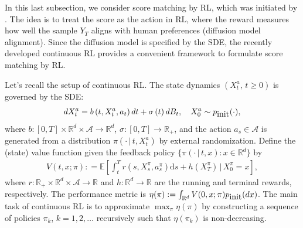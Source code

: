 \documentclass[letterpaper,11pt,reqno]{amsart}
\numberwithin{equation}{section}
\begin{document}
In this last subsection, 
we consider score matching by RL,
which was initiated by \cite{Black23, fan2023optimizing, Lee23}.
The idea is to treat the score as the action in RL,
where the reward measures how well the sample $Y_T$ 
aligns with human preferences (diffusion model alignment).
Since the diffusion model is specified by the SDE,
the recently developed continuous RL \cite{Jia22, Jia222, WZZ20, ZTY23} provides 
a convenient framework to formulate score matching by RL.

\quad Let's recall the setup of continuous RL.
The state dynamics $(X^a_t, \, t \ge 0)$ is governed by the SDE:
\begin{equation}
\label{SDE_dynamic}
d X_t^a=b\left(t, X_t^a, a_t\right)dt+\sigma\left(t\right) d B_t,\quad X^a_0\sim p_{\tiny \mbox{init}}(\cdot),
\end{equation}
where $b:[0,T]\times\mathbb{R}^d \times \mathcal{A} \to \mathbb{R}^d$,
$\sigma:[0,T]\to \mathbb{R}_+$,
and the action $a_s \in \mathcal{A}$ is generated from a distribution $\pi\left(\cdot \,|\, t, X^a_t\right)$ by external randomization.
Define the (state) value function given the feedback policy $\{\pi(\cdot \,|\, t, x): x \in \mathbb{R}^d\}$ by
\begin{equation*}
\label{Value function Definition}
\begin{aligned}
V( t, x ; \pi) : = \mathbb{E} \left[\int_t^{T} r\left(s, X_s^\pi, a_s^\pi\right) \mathrm{d} s +h(X_T^{\pi}) \, \bigg| \, X_0^\pi = x \right],
\end{aligned}
\end{equation*}
where $r:\mathbb{R}_+ \times \mathbb{R}^d \times \mathcal{A} \to \mathbb{R}$ and $h: \mathbb{R}^d \to \mathbb{R}$ are the running and terminal rewards, respectively.
The performance metric is 
$\eta(\pi):= \int_{\mathbb{R}^d} V(0, x; \pi) p_{\tiny \mbox{init}}(dx)$.
The main task of continuous RL is to approximate
$\max_\pi \eta(\pi)$ by constructing a sequence of policies $\pi_k$, $k = 1,2,\ldots$ recursively such that $\eta(\pi_k)$ is non-decreasing.
\end{document}
